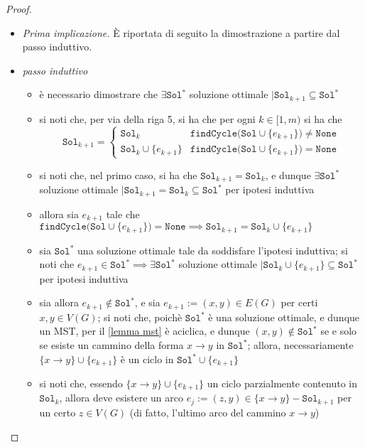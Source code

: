 \documentclass[a4paper, 12pt]{report}
\begin{document}
\begin{proof}
        \begin{itemize}
            \item[] \textit{Prima implicazione.} È riportata di seguito la dimostrazione a partire dal passo induttivo. 
            \item \textit{passo induttivo}
                \begin{itemize}
                    \item è necessario dimostrare che $\exists \texttt{Sol}^*$ soluzione ottimale $\mid \texttt{Sol}_{k + 1} \subseteq \texttt{Sol}^*$
                    \item si noti che, per via della riga 5, si ha che per ogni $k \in [1, m)$ si ha che $$\texttt{Sol}_{k +1} = \left \{ \begin{array}{ll} \texttt{Sol}_k & \texttt{findCycle(Sol} \cup \{e_{k +1}\} \texttt{)} \neq \texttt{None} \\ \texttt{Sol}_k \cup \{e_{k +1}\} & \texttt{findCycle(Sol} \cup \{e_{k +1}\} \texttt{)} = \texttt{None} \end{array} \right.$$
                    \item si noti che, nel primo caso, si ha che $\texttt{Sol}_{k +1} = \texttt{Sol}_k$, e dunque $\exists \texttt{Sol}^*$ soluzione ottimale $\mid \texttt{Sol}_{k +1} = \texttt{Sol}_k \subseteq \texttt{Sol}^*$ per ipotesi induttiva
                    \item allora sia $e_{k + 1}$ tale che $\texttt{findCycle(Sol} \cup \{e_{k +1}\} \texttt{)} = \texttt{None} \implies \texttt{Sol}_{k +1} = \texttt{Sol}_k \cup \{e_{k +1}\}$
                    \item sia $\texttt{Sol}^*$ una soluzione ottimale tale da soddisfare l'ipotesi induttiva; si noti che $e_{k +1} \in \texttt{Sol}^* \implies \exists \texttt{Sol}^*$ soluzione ottimale $\mid \texttt{Sol}_k \cup \{ e_{k +1}\} \subseteq \texttt{Sol}^*$ per ipotesi induttiva
                    \item sia allora $e_{k +1} \notin \texttt{Sol}^*$, e sia $e_{k+1}:=(x, y) \in E(G)$ per certi $x, y \in V(G)$; si noti che, poichè $\texttt{Sol}^*$ è una soluzione ottimale, e dunque un MST, per il \cref{lemma mst} è aciclica, e dunque $(x, y) \notin \texttt{Sol}^*$ se e solo se esiste un cammino della forma $x \rightarrow y$ in $\texttt{Sol}^*$; allora, necessariamente $\{x \rightarrow y\} \cup \{e_{k +1}\}$ è un ciclo in $\texttt{Sol}^* \cup \{e_{k +1}\}$
                    \item si noti che, essendo $\{x \rightarrow y\} \cup \{e_{k +1}\}$ un ciclo parzialmente contenuto in $\texttt{Sol}_k$, allora deve esistere un arco $e_j := (z, y) \in \{x \rightarrow y\} - \texttt{Sol}_{k +1}$ per un certo $z \in V(G)$ (di fatto, l'ultimo arco del cammino $x \rightarrow y$)

\end{itemize}
\end{itemize}
\end{proof}
\end{document}

